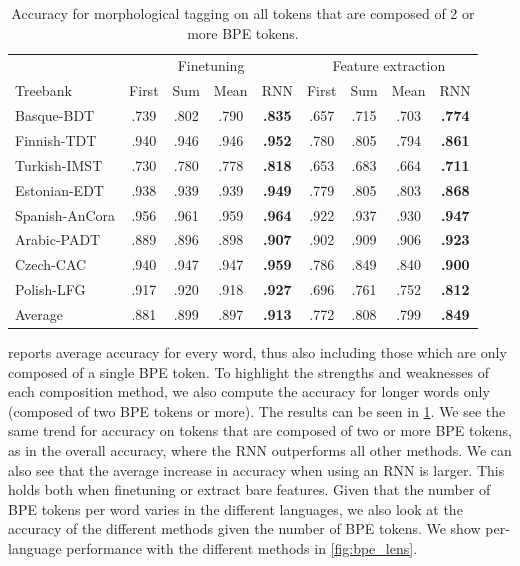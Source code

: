 \documentclass[11pt]{article}
\begin{document}
	\begin{table}%
	\centering
	\begin{tabular}{l|cccc|cccc}
		 & \multicolumn{4}{c}{Finetuning} & \multicolumn{4}{c}{Feature extraction} \\
		Treebank & First & Sum & Mean & RNN & First & Sum & Mean & RNN  \\
		 \hline
        Basque-BDT      & .739 & .802 & .790 & \textbf{.835} & .657 & .715 & .703 & \textbf{.774} \\
		Finnish-TDT     & .940 & .946 & .946 & \textbf{.952} & .780 & .805 & .794 & \textbf{.861} \\ 
		Turkish-IMST    & .730 & .780 & .778 & \textbf{.818} & .653 & .683 & .664 & \textbf{.711} \\
		Estonian-EDT    & .938 & .939 & .939 & \textbf{.949} & .779 & .805 & .803 & \textbf{.868} \\
		Spanish-AnCora  & .956 & .961 & .959 & \textbf{.964} & .922 & .937 & .930 & \textbf{.947} \\
		Arabic-PADT     & .889 & .896 & .898 & \textbf{.907} & .902 & .909 & .906 & \textbf{.923}\\
		Czech-CAC       & .940 & .947 & .947 & \textbf{.959} & .786 & .849 & .840 & \textbf{.900} \\
		Polish-LFG      & .917 & .920 & .918 & \textbf{.927} & .696 & .761 & .752 & \textbf{.812} \\
        \hline
        Average         & .881 & .899 & .897 & \textbf{.913} & .772 & .808 & .799 & \textbf{.849} \\
	\end{tabular}
    \caption{\label{tab:results_large_tokens} Accuracy for
     morphological tagging on all tokens that are composed of 2 or
     more BPE tokens.}
\end{table}

         reports average accuracy for every word,
    thus also including those which are only composed of a single BPE
    token. To highlight the strengths and weaknesses of each
    composition method, we also compute the accuracy for longer words only 
    (composed of two BPE tokens or more). The results can be seen in
    \cref{tab:results_large_tokens}.
            We see the same trend for accuracy on tokens that are
     composed of two or more BPE tokens, as in the overall accuracy,
     where the RNN outperforms all other methods. We
     can also see that the average increase in accuracy when using an
     RNN is larger. This holds both when finetuning or extract bare features.
        Given that the number of BPE tokens per word varies in the
     different languages, we also look at the accuracy of the
     different methods given the number of BPE tokens. We show
     per-language performance with the different methods in
     \cref{fig:bpe_lens}.
    
\end{document}
